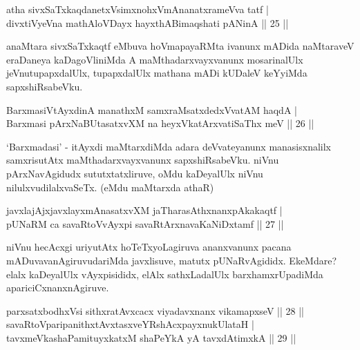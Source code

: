 
\begin{shl}
atha sivxSaTxkaqdanetxV\s simxnohxVmAnanatxrameVva tatf | \\
divxtiVyeVna mathA\s \s loVDayx hayxthABimaqshati pANinA \hfill|| 25 || 
\end{shl}

\begin{artha}
anaMtara sivxSaTxkaqtf eMbuva hoVmapayaRMta ivanunx mADida naMtaraveV eraDaneya kaDagoVliniMda A maMthadarxvayxvanunx mosarinalUlx jeVnutupapxdalUlx, tupapxdalUlx mathana mADi kUDaleV keYyiMda sapxshiRsabeVku.
\end{artha}


\begin{shl}
BarxmasiVtAyxdinA manathxM samxraMsatxdedxVvatAM haqdA | \\
Barxmasi pArxNaBUtasatxvXM na heyxVkatArxvatiSaThx meV \hfill|| 26 || 
\end{shl}

\begin{artha}
`Barxmadasi' - itAyxdi maMtarxdiMda adara deVvateyanunx manasisxnalilx samxrisutAtx maMthadarxvayxvanunx sapxshiRsabeVku. niVnu pArxNavAgidudx sututxtatxliruve, oMdu kaDeyalUlx niVnu nilulxvudilalxvaSeTx. (eMdu maMtarxda athaR)
\end{artha}


\begin{shl}
javxlajAjxjavxlayxmAnasatxvXM jaTharasAthxnanxpAkakaqtf | \\
pUNaRM ca savaRtoVvAyxpi savaRtArxnavaKaNiDxtamf \hfill|| 27 || 
\end{shl}

\begin{artha}
niVnu hecAcxgi uriyutAtx hoTeTxyoLagiruva ananxvanunx pacana mADuvavanAgiruvudariMda javxlisuve, matutx pUNaRvAgididx. EkeMdare? elalx kaDeyalUlx vAyxpisididx, elAlx sathxLadalUlx barxhamxrUpadiMda apariciCxnanxnAgiruve.
\end{artha}


\begin{shl}
parxsatxbodhxV\s si sithxratAvxcacx viyadavxnanx vikamapxseV \hfill|| 28 || \\
savaRtoV\s paripanithxtAvxtasxveYRshAcxpayxnukUlataH | \\
tavxmeVkashaPamituyxkatxM shaPeYkA yA tavxdAtimxkA \hfill|| 29 || 
\end{shl}

